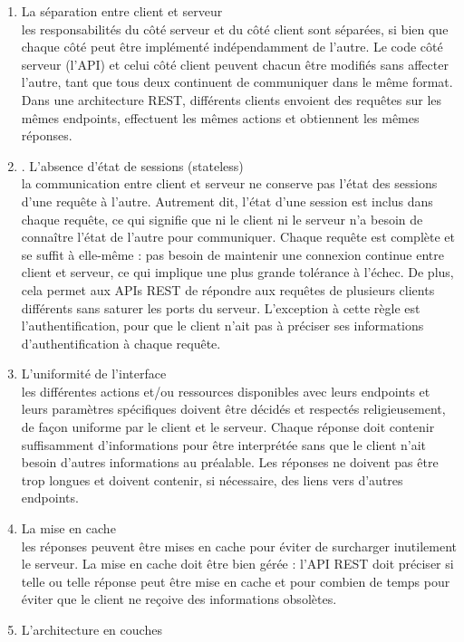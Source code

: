 \begin{enumerate}
	\item La séparation entre client et serveur\\
les responsabilités du côté serveur et du côté client sont
séparées, si bien que chaque côté peut être implémenté indépendamment de l’autre. Le code
côté serveur (l’API) et celui côté client peuvent chacun être modifiés sans affecter l’autre, tant
que tous deux continuent de communiquer dans le même format. Dans une architecture REST,
différents clients envoient des requêtes sur les mêmes endpoints, effectuent les mêmes actions et
obtiennent les mêmes réponses.
     \item . L’absence d’état de sessions (stateless)\\
la communication entre client et serveur ne conserve pas
l’état des sessions d’une requête à l’autre. Autrement dit, l’état d’une session est inclus dans
chaque requête, ce qui signifie que ni le client ni le serveur n’a besoin de connaître l’état de
l’autre pour communiquer. Chaque requête est complète et se suffit à elle-même : pas besoin de maintenir une connexion continue entre client et serveur, ce qui implique une plus
grande tolérance à l’échec. De plus, cela permet aux APIs REST de répondre aux requêtes
de plusieurs clients différents sans saturer les ports du serveur. L’exception à cette règle est
l’authentification, pour que le client n’ait pas à préciser ses informations d’authentification à
chaque requête.
      \item L’uniformité de l’interface\\
les différentes actions et/ou ressources disponibles avec leurs endpoints et leurs paramètres spécifiques doivent être décidés et respectés religieusement, de façon
uniforme par le client et le serveur. Chaque réponse doit contenir suffisamment d’informations
pour être interprétée sans que le client n’ait besoin d’autres informations au préalable. Les
réponses ne doivent pas être trop longues et doivent contenir, si nécessaire, des liens vers d’autres
endpoints. 
       \item La mise en cache\\
les réponses peuvent être mises en cache pour éviter de surcharger inutilement le serveur. La mise en cache doit être bien gérée : l’API REST doit préciser si telle ou telle
réponse peut être mise en cache et pour combien de temps pour éviter que le client ne reçoive
des informations obsolètes.
        \item L’architecture en couches\\

\end{enumerate}
